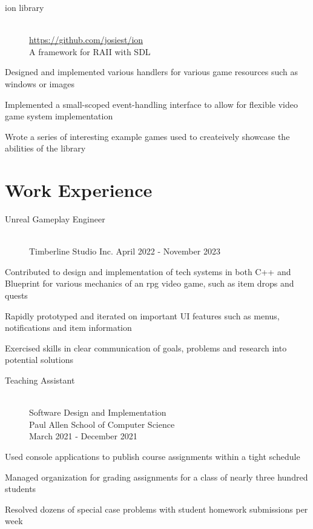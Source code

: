 \documentclass[10pt]{article}
\newenvironment{itemize*}
{\begin{itemize}[leftmargin=*]
    \setlength{\parskip}{0.5pt}}
{\end{itemize}}
\begin{document}
\begin{paracol}{2}
\begin{description}
\item[ion library] \hfill \\
    \url{https://github.com/josiest/ion}\\
    A framework for RAII with SDL
\end{description}
\begin{itemize*}
\item Designed and implemented various handlers for various game resources such
      as windows or images
\item Implemented a small-scoped event-handling interface to allow for flexible
      video game system implementation
\item Wrote a series of interesting example games used to createively showcase
      the abilities of the library
\end{itemize*}

\switchcolumn
\section*{Work Experience}

\begin{description}
\item[Unreal Gameplay Engineer] \hfill \\
    Timberline Studio Inc.
    April 2022 - November 2023
\end{description}
\begin{itemize*}
\item Contributed to design and implementation of tech systems in both C++ and Blueprint for various mechanics of an rpg video game, such as item drops and quests
\item Rapidly prototyped and iterated on important UI features such as menus, notifications and item information
\item Exercised skills in clear communication of goals, problems and research into potential solutions
\end{itemize*}


\begin{description}
\item[Teaching Assistant] \hfill \\
    Software Design and Implementation \\
    Paul Allen School of Computer Science \\
    March 2021 - December 2021
\end{description}
\begin{itemize*}
\item Used console applications to publish course assignments within a tight schedule
\item Managed organization for grading assignments for a class of nearly three
      hundred students
\item Resolved dozens of special case problems with student homework
      submissions per week
\end{itemize*}


\end{paracol}
\end{document}
